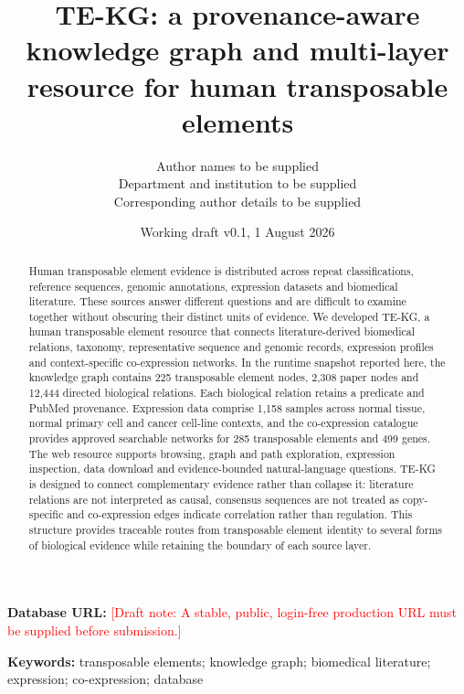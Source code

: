 \documentclass{article}
\title{TE-KG: a provenance-aware knowledge graph and multi-layer resource for human transposable elements}
\author{Author names to be supplied\\Department and institution to be supplied\\Corresponding author details to be supplied}
\date{Working draft v0.1, 1 August 2026}
\newcommand{\draftnote}[1]{\textcolor{red}{[Draft note: #1]}}
\begin{document}
\maketitle

\begin{abstract}
Human transposable element evidence is distributed across repeat classifications, reference sequences, genomic annotations, expression datasets and biomedical literature. These sources answer different questions and are difficult to examine together without obscuring their distinct units of evidence. We developed TE-KG, a human transposable element resource that connects literature-derived biomedical relations, taxonomy, representative sequence and genomic records, expression profiles and context-specific co-expression networks. In the runtime snapshot reported here, the knowledge graph contains 225 transposable element nodes, 2,308 paper nodes and 12,444 directed biological relations. Each biological relation retains a predicate and PubMed provenance. Expression data comprise 1,158 samples across normal tissue, normal primary cell and cancer cell-line contexts, and the co-expression catalogue provides approved searchable networks for 285 transposable elements and 499 genes. The web resource supports browsing, graph and path exploration, expression inspection, data download and evidence-bounded natural-language questions. TE-KG is designed to connect complementary evidence rather than collapse it: literature relations are not interpreted as causal, consensus sequences are not treated as copy-specific and co-expression edges indicate correlation rather than regulation. This structure provides traceable routes from transposable element identity to several forms of biological evidence while retaining the boundary of each source layer.
\end{abstract}

\noindent\textbf{Database URL:} \draftnote{A stable, public, login-free production URL must be supplied before submission.}

\noindent\textbf{Keywords:} transposable elements; knowledge graph; biomedical literature; expression; co-expression; database









\end{document}
